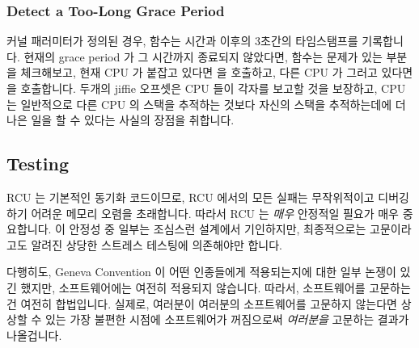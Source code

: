 \subsubsection{Detect a Too-Long Grace Period}
\label{app:rcuimpl:rcutree:Detect a Too-Long Grace Period}

 커널 패러미터가 정의된 경우,
 함수는 시간과 이후의 3초간의 타임스탬프를
기록합니다.
현재의 grace period 가 그 시간까지 종료되지 않았다면, 
함수는 문제가 있는 부분을 체크해보고, 현재 CPU 가 붙잡고 있다면
 을 호출하고, 다른 CPU 가 그러고 있다면
 을 호출합니다.
두개의 jiffie 오프셋은 CPU 들이 각자를 보고할 것을 보장하고, CPU 는 일반적으로
다른 CPU 의 스택을 추적하는 것보다 자신의 스택을 추적하는데에 더 나은 일을 할
수 있다는 사실의 장점을 취합니다.
\iffalse

When the \co{CONFIG_RCU_CPU_STALL_DETECTOR} kernel parameter
is specified, the \co{record_gp_stall_check_time()} function
records the time and also a timestamp set three seconds into the future.
If the current grace period still has not ended by that time, the
\co{check_cpu_stall()} function will check for the culprit,
invoking \co{print_cpu_stall()} if the current CPU is the
holdout, or \co{print_other_cpu_stall()} if it is some other CPU.
A two-jiffies offset helps ensure that CPUs report on themselves
when possible, taking advantage of the fact that a CPU can normally
do a better job of tracing its own stack than it can tracing some other
CPU's stack.
\fi

\subsection{Testing}
\label{app:rcuimpl:rcutree:Testing}

RCU 는 기본적인 동기화 코드이므로, RCU 에서의 모든 실패는 무작위적이고 디버깅
하기 어려운 메모리 오렴을 초래합니다.
따라서 RCU 는 \emph{매우} 안정적일 필요가 매우 중요합니다.
이 안정성 중 일부는 조심스런 설계에서 기인하지만, 최종적으로는 고문이라고도
알려진 상당한 스트레스 테스팅에 의존해야만 합니다.

다행히도, Geneva Convention 이 어떤 인종들에게 적용되는지에 대한 일부 논쟁이
있긴 했지만, 소프트웨어에는 여전히 적용되지 않습니다.
따라서, 소프트웨어를 고문하는건 여전히 합법입니다.
실제로, 여러분이 여러분의 소프트웨어를 고문하지 않는다면 상상할 수 있는 가장
불편한 시점에 소프트웨어가 꺼짐으로써 \emph{여러분을} 고문하는 결과가
나올겁니다.
\iffalse

